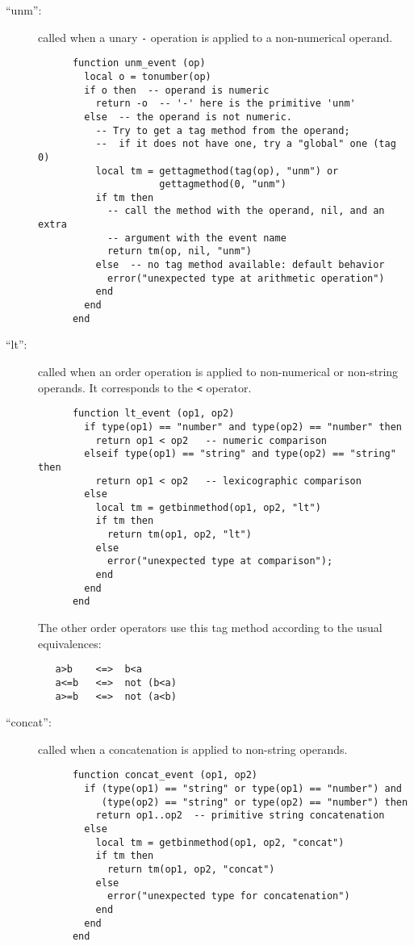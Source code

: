 \documentclass[11pt]{article}
\begin{document}
\begin{description}
\item[``unm'':]
called when a unary \verb|-| operation is applied to a non-numerical operand.
\begin{verbatim}
      function unm_event (op)
        local o = tonumber(op)
        if o then  -- operand is numeric
          return -o  -- '-' here is the primitive 'unm'
        else  -- the operand is not numeric.
          -- Try to get a tag method from the operand;
          --  if it does not have one, try a "global" one (tag 0)
          local tm = gettagmethod(tag(op), "unm") or
                     gettagmethod(0, "unm")
          if tm then
            -- call the method with the operand, nil, and an extra
            -- argument with the event name
            return tm(op, nil, "unm")
          else  -- no tag method available: default behavior
            error("unexpected type at arithmetic operation")
          end
        end
      end
\end{verbatim}

\item[``lt'':]
called when an order operation is applied to non-numerical
or non-string operands.
It corresponds to the \verb|<| operator.
\begin{verbatim}
      function lt_event (op1, op2)
        if type(op1) == "number" and type(op2) == "number" then
          return op1 < op2   -- numeric comparison
        elseif type(op1) == "string" and type(op2) == "string" then
          return op1 < op2   -- lexicographic comparison
        else
          local tm = getbinmethod(op1, op2, "lt")
          if tm then
            return tm(op1, op2, "lt")
          else
            error("unexpected type at comparison");
          end
        end
      end
\end{verbatim}
The other order operators use this tag method according to the
usual equivalences:
\begin{verbatim}
   a>b    <=>  b<a
   a<=b   <=>  not (b<a)
   a>=b   <=>  not (a<b)
\end{verbatim}

\item[``concat'':]
called when a concatenation is applied to non-string operands.
\begin{verbatim}
      function concat_event (op1, op2)
        if (type(op1) == "string" or type(op1) == "number") and
           (type(op2) == "string" or type(op2) == "number") then
          return op1..op2  -- primitive string concatenation
        else
          local tm = getbinmethod(op1, op2, "concat")
          if tm then
            return tm(op1, op2, "concat")
          else
            error("unexpected type for concatenation")
          end
        end
      end
\end{verbatim}


\end{description}
\end{document}
